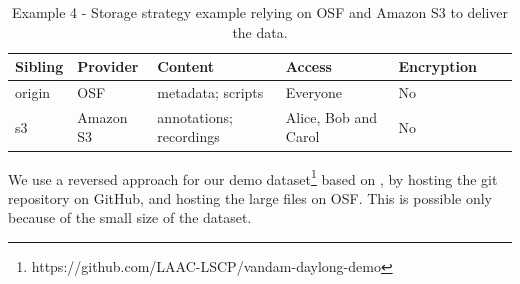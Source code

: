 \documentclass[smallextended]{svjour3}       %
\begin{document}
\begin{table}[!htbp]
\centering
\begin{tabular}{@{}lllllll@{}}
\toprule
\textbf{Sibling} & \textbf{Provider} & \textbf{Content} & \textbf{Access} & \textbf{Encryption} \\ \midrule
origin   & OSF     & metadata; scripts & Everyone & No  \\
s3 & Amazon S3  & annotations; recordings & Alice, Bob and Carol  & No \\ \bottomrule
\end{tabular}
\caption{\label{table:storage4}Example 4 - Storage strategy example relying on OSF and Amazon S3 to deliver the data.}
\end{table}

We use a reversed approach for our demo dataset\footnote{https://github.com/LAAC-LSCP/vandam-daylong-demo} based on  \citep{vandam-day}, by hosting the git repository on GitHub, and hosting the large files on OSF. This is possible only because of the small size of the dataset.



\end{document}
